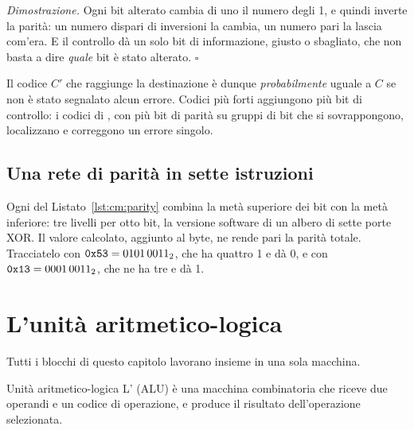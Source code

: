 \noindent\emph{Dimostrazione.} Ogni bit alterato cambia di uno il numero degli
1, e quindi inverte la parità: un numero dispari di inversioni la cambia, un
numero pari la lascia com'era. E il controllo dà un solo bit di informazione,
giusto o sbagliato, che non basta a dire \emph{quale} bit è stato alterato.
\hfill$\square$

\smallskip
Il codice $C'$ che raggiunge la destinazione è dunque \emph{probabilmente}
uguale a $C$ se non è stato segnalato alcun errore. Codici più forti aggiungono
più bit di controllo: i codici di \citet{hamming1950}, con più bit di parità su
gruppi di bit che si sovrappongono, localizzano e correggono un errore singolo.

\subsection{Una rete di parità in sette istruzioni}


Ogni  del Listato~\ref{lst:cm:parity} combina la metà superiore dei
bit con la metà inferiore: tre livelli per otto bit, la versione software di un
albero di sette porte XOR. Il valore calcolato, aggiunto al byte, ne rende pari
la parità totale. Tracciatelo con $\texttt{0x53}=0101\,0011_2$, che ha quattro 1 e
dà 0, e con $\texttt{0x13}=0001\,0011_2$, che ne ha tre e dà 1.

\section{L'unità aritmetico-logica}

Tutti i blocchi di questo capitolo lavorano insieme in una sola macchina.

\begin{definition}{Unità aritmetico-logica}
L' (ALU) è una macchina combinatoria che riceve
due operandi e un codice di operazione, e produce il risultato dell'operazione
selezionata.
\end{definition}

